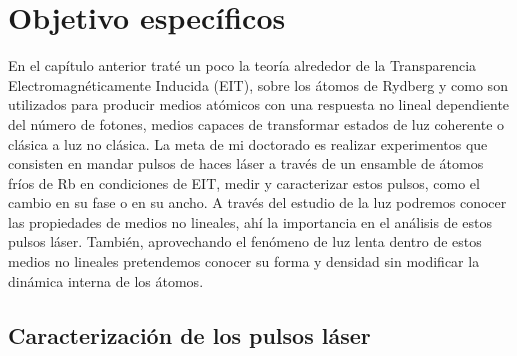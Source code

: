 \chapter{\label{cap:objetivosEspecificos}Objetivo específicos}

En el capítulo anterior traté un poco la teoría alrededor de la Transparencia Electromagnéticamente Inducida (EIT), sobre los átomos de Rydberg y como son utilizados para producir medios atómicos con una respuesta no lineal dependiente del número de fotones, medios capaces de transformar estados de luz coherente o clásica a luz no clásica. La meta de mi doctorado es realizar experimentos que consisten en mandar pulsos de haces láser a través de un ensamble de átomos fríos de Rb en condiciones de EIT, medir y caracterizar estos pulsos, como el cambio en su fase o en su ancho. A través del estudio de la luz podremos conocer las propiedades de medios no lineales, ahí la importancia en el análisis de estos pulsos láser. También, aprovechando el fenómeno de luz lenta dentro de estos medios no lineales pretendemos conocer su forma y densidad sin modificar la dinámica interna de los átomos.

%
%

\section{\label{sec:caracterizacionFase}Caracterización de los pulsos láser}

